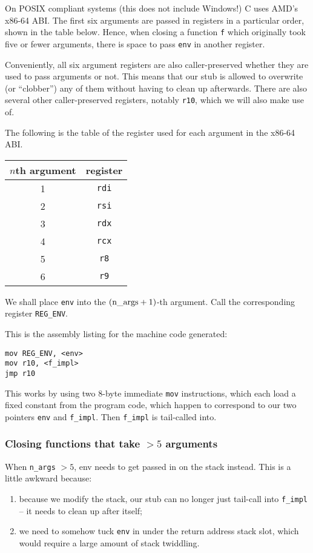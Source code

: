 \documentclass[12pt,a4paper,twoside,openright]{report}
\begin{document}
On POSIX compliant systems (this does not include Windows!) C uses AMD's x86-64
ABI. The first six arguments are passed in registers in a particular order,
shown in the table below. Hence, when closing a function \lstinline!f! which
originally took five or fewer arguments, there is space to pass \lstinline!env!
in another register.

Conveniently, all six argument registers are also caller-preserved whether they
are used to pass arguments or not. This means that our stub is allowed to
overwrite (or ``clobber'') any of them without having to clean up afterwards.
There are also several other caller-preserved registers, notably
\lstinline!r10!, which we will also make use of.

The following is the table of the register used for each argument in the x86-64
ABI.

\begin{tabular}{ c | c }
  $n$th argument & register \\
  \hline
  1 & \lstinline!rdi! \\
  2 & \lstinline!rsi! \\
  3 & \lstinline!rdx! \\
  4 & \lstinline!rcx! \\
  5 & \lstinline!r8! \\
  6 & \lstinline!r9!
\end{tabular}

We shall place \lstinline!env! into the $(\text{\lstinline|n\_args|}+1)$-th argument. Call the
corresponding register \lstinline!REG_ENV!.

This is the assembly listing for the machine code generated:

\begin{lstlisting}
mov REG_ENV, <env>
mov r10, <f_impl>
jmp r10
\end{lstlisting}

This works by using two 8-byte immediate \lstinline!mov! instructions, which
each load a fixed constant from the program code, which happen to correspond to
our two pointers \lstinline!env! and \lstinline!f_impl!.
Then \lstinline!f_impl! is tail-called into.

\subsubsection{Closing functions that take $> 5$ arguments}

When \lstinline{n_args} $> 5$, env needs to get passed in on the stack instead.
This is a little awkward because:
\begin{enumerate}
    \item because we modify the stack, our stub can no longer just tail-call into \lstinline{f_impl} -- it needs to clean up after itself;
  \item we need to somehow tuck \lstinline{env} in under the return address stack slot, which would require a large amount of stack twiddling.
\end{enumerate}
\end{document}
